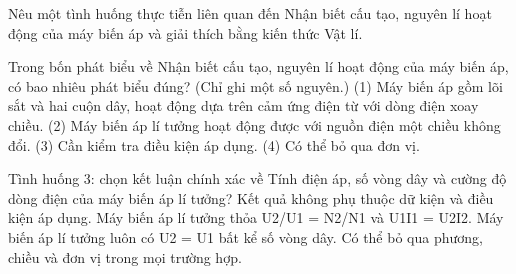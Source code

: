 \begin{bt}
Nêu một tình huống thực tiễn liên quan đến Nhận biết cấu tạo, nguyên lí hoạt động của máy biến áp và giải thích bằng kiến thức Vật lí.
\end{bt}

\begin{ex}
Trong bốn phát biểu về Nhận biết cấu tạo, nguyên lí hoạt động của máy biến áp, có bao nhiêu phát biểu đúng? (Chỉ ghi một số nguyên.) (1) Máy biến áp gồm lõi sắt và hai cuộn dây, hoạt động dựa trên cảm ứng điện từ với dòng điện xoay chiều. (2) Máy biến áp lí tưởng hoạt động được với nguồn điện một chiều không đổi. (3) Cần kiểm tra điều kiện áp dụng. (4) Có thể bỏ qua đơn vị.
\end{ex}

\begin{ex}
Tình huống 3: chọn kết luận chính xác về Tính điện áp, số vòng dây và cường độ dòng điện của máy biến áp lí tưởng?
\choice
{Kết quả không phụ thuộc dữ kiện và điều kiện áp dụng.}
{\True Máy biến áp lí tưởng thỏa U2/U1 = N2/N1 và U1I1 = U2I2.}
{Máy biến áp lí tưởng luôn có U2 = U1 bất kể số vòng dây.}
{Có thể bỏ qua phương, chiều và đơn vị trong mọi trường hợp.}
\end{ex}

